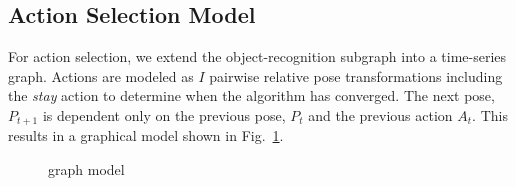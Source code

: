\documentclass[conference]{IEEEtran}
\newcommand{\figref}[1]{Fig.~\ref{#1}}
\newcommand{\set}[1]{\mathbf{#1}} %
\newcommand{\italic}[1]{\textit{#1}} %
\begin{document}
    \subsection{Action Selection Model}
        For action selection, we extend the object-recognition subgraph into a time-series graph. Actions are modeled as $I$ pairwise relative pose transformations including the \italic{stay} action to determine when the algorithm has converged. The next pose, $P_{t+1}$ is dependent only on the previous pose, $P_t$ and the previous action $A_t$. This results in a graphical model shown in \figref{fig:fullGraph}.
        \begin{figure}[h]
          \centering
          \caption{graph model}
          \label{fig:fullGraph}
        \end{figure}


\end{document}
